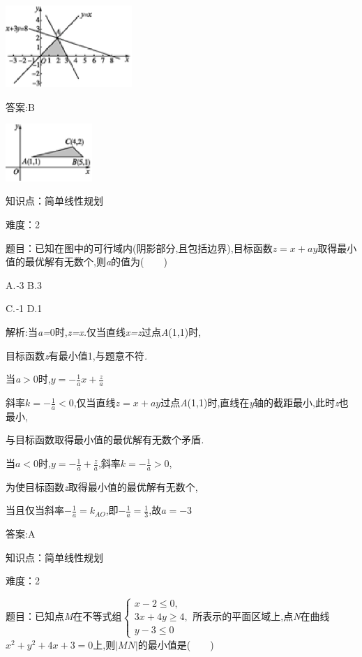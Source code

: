 \documentclass{article} %
\begin{document}
 \includegraphics*[width=1.89in, height=1.22in, keepaspectratio=false]{image1735}

 答案:B

 \includegraphics*[width=1.29in, height=0.86in, keepaspectratio=false]{image1736}


知识点：简单线性规划

难度：2

题目：已知在图中的可行域内(阴影部分,且包括边界),目标函数$z=x+ay$取得最小值的最优解有无数个,则\textit{a}的值为(\textit{　　})

 A.\textit{-}3 B.3

 C.\textit{-}1 D.1

 解析:当\textit{a=}0时,\textit{z=x.}仅当直线\textit{x=z}过点\textit{A}(1,1)时,

目标函数\textit{z}有最小值1,与题意不符\textit{.}

当\textit{a$>$}0时,$y=-\frac{1}{a}x+\frac{z}{a}$

斜率$k=-\frac{1}{a}<0$,仅当直线$z=x+ay$过点\textit{A}(1,1)时,直线在\textit{y}轴的截距最小,此时\textit{z}也最小,

与目标函数取得最小值的最优解有无数个矛盾\textit{.}

当$a<0$时,$y=-\frac{1}{a}+\frac{z}{a}$,斜率$k=-\frac{1}{a}>0$,

为使目标函数\textit{z}取得最小值的最优解有无数个,

当且仅当斜率$-\frac{1}{a}=k_{AO}$,即$-\frac{1}{a}=\frac{1}{3}$,故$a=-3$

 答案:A


知识点：简单线性规划

难度：2

题目：已知点\textit{M}在不等式组$
\begin{cases}
x-2 \le 0,\\
3x+4y\ge 4,\\
y-3 \le 0
\end{cases}$所表示的平面区域上,点\textit{N}在曲线$x^2+y^2+4x+3=0$上,则$|MN|$的最小值是(\textit{　　})
\end{document}
